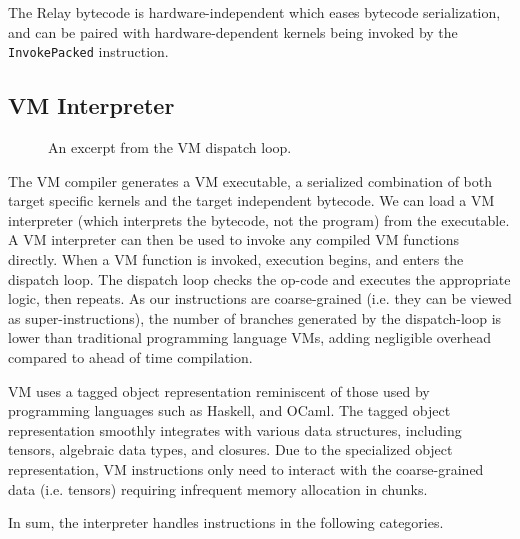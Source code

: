 The Relay bytecode is hardware-independent which eases bytecode serialization, and can be paired with hardware-dependent kernels being invoked by the \texttt{InvokePacked} instruction.

\subsection{VM Interpreter}

\begin{figure}[th]
  
  \caption{An excerpt from the VM dispatch loop.}
  \label{fig:vm_interpreter}
\end{figure}

The VM compiler generates a VM executable,
  a serialized combination of both target specific kernels
  and the target independent bytecode.
We can load a VM interpreter (which interprets the bytecode, not the program) from the executable.
A VM interpreter can then be used to invoke any compiled VM
  functions directly.
When a VM function is invoked, execution begins, and enters the dispatch loop.
The dispatch loop checks the op-code and executes the appropriate logic, then repeats.
As our instructions are coarse-grained (i.e. they can be viewed as super-instructions),
the number of branches generated by the dispatch-loop is lower than traditional programming language VMs,
adding negligible overhead compared to ahead of time compilation.

VM uses a tagged object representation reminiscent of those used by programming languages such as Haskell, and OCaml.
The tagged object representation smoothly integrates with various data structures, including tensors,
algebraic data types, and closures. Due to the specialized object representation,
VM instructions only need to interact with the coarse-grained data (i.e. tensors) requiring infrequent memory allocation in chunks.

In sum, the interpreter handles instructions in the following categories.

